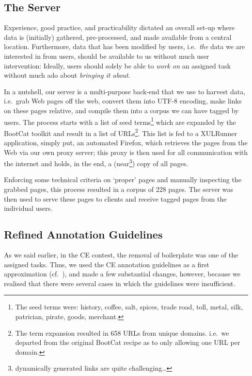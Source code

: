 \documentclass[12pt,a4paper]{article}
\begin{document}
\subsection{The Server}
Experience, good practice, and practicability dictated an overall set-up where data is (initially) gathered, pre-processed, and made available from a central location. 
Furthermore, data that has been modified by users, i.e.~\textit{the} data we are interested in from users, should be available to us without much user intervention: 
Ideally, users should solely be able to \textit{work on} an assigned task without much ado about \textit{bringing it about}.  

In a nutshell, our server is a multi-purpose back-end that we use to harvest data, i.e.~grab Web pages off the web, convert them into UTF-8 encoding\cite{unicode.org}, make links on these pages relative\cite{w3.org/base}, and compile them into a corpus we can have tagged by users. 
The process starts with a list of seed terms\footnote{The seed terms were: history, coffee, salt, spices, trade road, toll, metal, silk, patrician, pirate, goods, merchant.} which are expanded by the BootCat toolkit\cite{BaroniSilvia2004} and result in a list of URLs\footnote{The term expansion resulted in 658 URLs from unique domains. i.e.~we departed from the original BootCat recipe as to only allowing one URL per domain.}. 
This list is fed to a XULRunner application\cite{xulrunner}, simply put, an automated Firefox\cite{firefox}, which retrieves the pages from the Web via our own proxy server\cite{wwwoffle}; this proxy is then used for all communication with the internet and holds, in the end, a (near\footnote{dynamically generated links are quite challenging\ldots}) copy of all pages. 

Enforcing some technical criteria on `proper' pages and manually inspecting the grabbed pages, this process resulted in a corpus of 228 pages. The server was then used to serve these pages to clients and receive tagged pages from the individual users.


\subsection{Refined Annotation Guidelines\footnotemark}

As we said earlier, in the CE contest, the removal of boilerplate was one of the assigned tasks. 
Thus, we used the CE annotation guidelines as a first approximation (cf.~\cite{cleaneval/annotation_guidelines}), and made a few substantial changes, however, because we realised that there were several cases in which the guidelines were insufficient.
\end{document}
